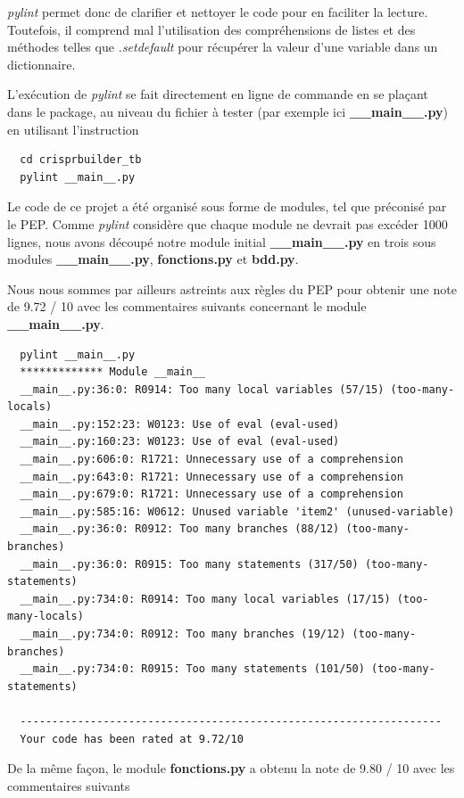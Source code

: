 \documentclass[twoside,a4paper,11pt,frenchb,openany]{report}
\begin{document}
\textit{pylint} permet donc de clarifier et nettoyer le code pour en faciliter la lecture. Toutefois, il comprend mal l'utilisation des compréhensions de listes et des méthodes telles que \textit{.setdefault} pour récupérer la valeur d'une variable dans un dictionnaire. 

L'exécution de \textit{pylint} se fait directement en ligne de commande en se plaçant dans le package, au niveau du fichier à tester (par exemple ici \textbf{\_\_main\_\_.py}) en utilisant l'instruction

\begin{verbatim}  cd crisprbuilder_tb
  pylint __main__.py
\end{verbatim}

Le code de ce projet a été organisé sous forme de modules, tel que préconisé par le PEP. Comme \textit{pylint} considère que chaque module ne devrait pas excéder 1000 lignes, nous avons découpé notre module initial \textbf{\_\_main\_\_.py} en trois sous modules \textbf{\_\_main\_\_.py}, \textbf{fonctions.py} et \textbf{bdd.py}.

Nous nous sommes par ailleurs astreints aux règles du PEP pour obtenir une note de 9.72 / 10 avec les commentaires suivants concernant le module \textbf{\_\_main\_\_.py}. 

\begin{verbatim}  pylint __main__.py
  ************* Module __main__
  __main__.py:36:0: R0914: Too many local variables (57/15) (too-many-locals)
  __main__.py:152:23: W0123: Use of eval (eval-used)
  __main__.py:160:23: W0123: Use of eval (eval-used)
  __main__.py:606:0: R1721: Unnecessary use of a comprehension
  __main__.py:643:0: R1721: Unnecessary use of a comprehension
  __main__.py:679:0: R1721: Unnecessary use of a comprehension
  __main__.py:585:16: W0612: Unused variable 'item2' (unused-variable)
  __main__.py:36:0: R0912: Too many branches (88/12) (too-many-branches)
  __main__.py:36:0: R0915: Too many statements (317/50) (too-many-statements)
  __main__.py:734:0: R0914: Too many local variables (17/15) (too-many-locals)
  __main__.py:734:0: R0912: Too many branches (19/12) (too-many-branches)
  __main__.py:734:0: R0915: Too many statements (101/50) (too-many-statements)

  ------------------------------------------------------------------
  Your code has been rated at 9.72/10\end{verbatim}

De la même façon, le module \textbf{fonctions.py} a obtenu la note de 9.80 / 10 avec les commentaires suivants
\end{document}
